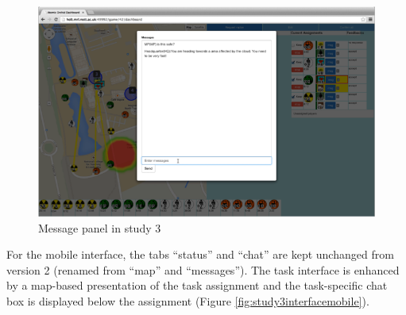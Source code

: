 \begin{figure}[H]
  \centering
  \includegraphics[width=1\textwidth]{img/conclusion/study3interfaceMSG}
  \caption{Message panel in study 3}
  \label{fig:study3interfaceMSG}
\end{figure}

For the mobile interface, the tabs ``status'' and ``chat'' are kept unchanged from version 2 (renamed from ``map'' and ``messages''). The task interface is enhanced by a map-based presentation of the task assignment and the task-specific chat box is displayed below the assignment (Figure \ref{fig:study3interfacemobile}).

